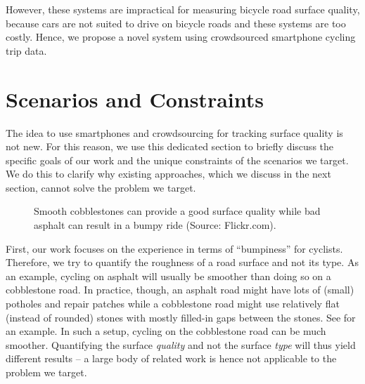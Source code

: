 However, these systems are impractical for measuring bicycle road surface quality, because cars are not suited to drive on bicycle roads and these systems are too costly.
Hence, we propose a novel system using crowdsourced smartphone cycling trip data.

\section{Scenarios and Constraints}
\label{sec:scenarios_and_constraints}
The idea to use smartphones and crowdsourcing for tracking surface quality is not new.
For this reason, we use this dedicated section to briefly discuss the specific goals of our work and the unique constraints of the scenarios we target.
We do this to clarify why existing approaches, which we discuss in the next section, cannot solve the problem we target.

\begin{figure}%
    \centering
    \hfill
    \caption{%
        Smooth cobblestones can provide a good surface quality while bad asphalt can result in a bumpy ride (Source: Flickr.com).
    }%
    \label{fig:cobblestone_vs_asphalt}
\end{figure}

First, our work focuses on the experience in terms of ``bumpiness'' for cyclists.
Therefore, we try to quantify the roughness of a road surface and not its type.
As an example, cycling on asphalt will usually be smoother than doing so on a cobblestone road.
In practice, though, an asphalt road might have lots of (small) potholes and repair patches while a cobblestone road might use relatively flat (instead of rounded) stones  with mostly filled-in gaps between the stones.
See  for an example.
In such a setup, cycling on the cobblestone road can be much smoother.
Quantifying the surface \emph{quality} and not the surface \emph{type} will thus yield different results -- a large body of related work is hence not applicable to the problem we target.

